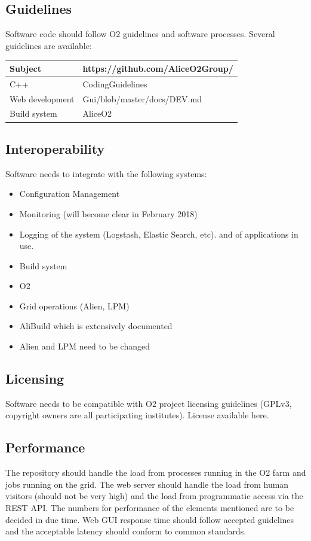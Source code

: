 \subsection{Guidelines}
Software code should follow O2 guidelines and software processes. Several guidelines are available:
\begin{table}
\begin{tabular}{lp{7cm}}
  \hline
  Subject & https://github.com/AliceO2Group/\\
  \hline
  \hline
   C++ & CodingGuidelines\\
   \hline
   Web development & Gui/blob/master/docs/DEV.md\\
   \hline
   Build system & AliceO2\\
   \hline
\end{tabular}
\end{table}

\subsection{Interoperability}

Software needs to integrate with the following systems: 
\begin{itemize}
  \item Configuration Management
  \item Monitoring (will become clear in February 2018)
  \item Logging of the system (Logstash, Elastic Search, etc). and of applications in use.
  \item Build system
  \item O2 
  \item Grid operations (Alien, LPM) 
  \item AliBuild which is extensively documented
  \item Alien and LPM need to be changed
\end{itemize}


\subsection{Licensing}
Software needs to be compatible with O2 project licensing guidelines (GPLv3, copyright owners are all participating institutes). 
License available here. 

\subsection{Performance}
The repository should handle the load from processes running in the O2 farm and jobs running on the grid. The web server should handle the load from human visitors (should not be very high) and the load from programmatic access via the REST API. The numbers for performance of the elements mentioned are to be decided in due time. Web GUI response time should follow accepted guidelines and the acceptable latency should conform to common standards.

